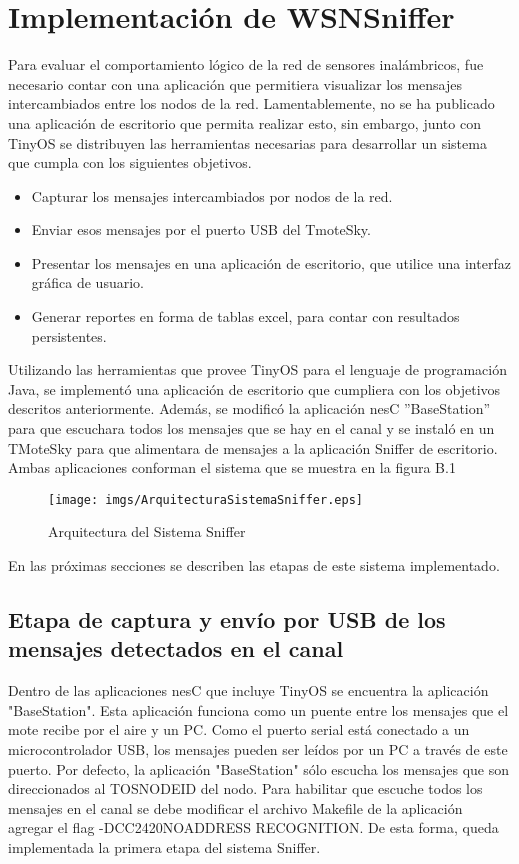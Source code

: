
\chapter{Implementación de WSNSniffer}
Para evaluar el comportamiento lógico de la red de sensores inalámbricos, fue necesario contar con una aplicación que permitiera visualizar los mensajes intercambiados  entre los  nodos de la red. Lamentablemente, no se ha publicado una aplicación de escritorio que permita realizar esto, sin embargo, junto con TinyOS se distribuyen las herramientas necesarias para desarrollar un sistema que cumpla con los siguientes objetivos.

\begin{itemize}
 \item Capturar los mensajes intercambiados por nodos de la red.
 \item Enviar esos mensajes por el puerto USB del TmoteSky.
 \item Presentar los mensajes en una aplicación de escritorio, que utilice una interfaz gráfica de usuario.
 \item Generar reportes en forma de tablas excel, para contar con resultados persistentes.
\end{itemize}

Utilizando las herramientas que provee TinyOS para el lenguaje de programación Java, se implementó una aplicación de escritorio que cumpliera con los objetivos descritos anteriormente. Además, se modificó la aplicación nesC ''BaseStation'' para que escuchara todos los mensajes que se hay en el canal y se instaló en un TMoteSky para que alimentara de mensajes a la aplicación Sniffer de escritorio. Ambas aplicaciones conforman el sistema que se muestra en la figura B.1
\begin{figure}[H]
	\centering
 	\texttt{[image: imgs/ArquitecturaSistemaSniffer.eps]} 
 	\caption{Arquitectura del Sistema Sniffer}
\end{figure}

En las próximas secciones se describen las etapas de este sistema implementado.

\section{Etapa de captura y envío por USB de los mensajes detectados en el canal}
Dentro de las aplicaciones nesC que incluye TinyOS se encuentra la aplicación "BaseStation". Esta aplicación funciona como un puente entre los mensajes que el mote recibe por el aire y un PC. Como el puerto serial está conectado a un microcontrolador USB, los mensajes pueden ser leídos por un PC a través de este puerto.  Por defecto, la aplicación "BaseStation" sólo escucha los mensajes que son direccionados al TOS\textunderscore NODE\textunderscore ID del nodo. Para habilitar que escuche todos los mensajes en el canal se debe modificar el archivo Makefile de la aplicación agregar el flag -DCC2420\textunderscore NO\textunderscore ADDRESS \textunderscore RECOGNITION. De esta forma, queda implementada la primera etapa del sistema Sniffer.

